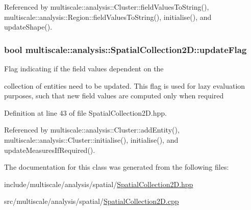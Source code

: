 Referenced by multiscale\-::analysis\-::\-Cluster\-::field\-Values\-To\-String(), multiscale\-::analysis\-::\-Region\-::field\-Values\-To\-String(), initialise(), and update\-Shape().

\hypertarget{classmultiscale_1_1analysis_1_1SpatialCollection2D_a6d942f2856adc673e9d361596744b37f}{
\subsubsection[{update\-Flag}]{\setlength{\rightskip}{0pt plus 5cm}bool multiscale\-::analysis\-::\-Spatial\-Collection2\-D\-::update\-Flag\hspace{0.3cm}{\ttfamily [protected]}}}\label{classmultiscale_1_1analysis_1_1SpatialCollection2D_a6d942f2856adc673e9d361596744b37f}
\begin{DoxyVerb}            Flag indicating if the field values dependent on the
\end{DoxyVerb}
 collection of entities need to be updated. This flag is used for lazy evaluation purposes, such that new field values are computed only when required 

Definition at line 43 of file Spatial\-Collection2\-D.\-hpp.



Referenced by multiscale\-::analysis\-::\-Cluster\-::add\-Entity(), multiscale\-::analysis\-::\-Cluster\-::initialise(), initialise(), and update\-Measures\-If\-Required().



The documentation for this class was generated from the following files\-:\begin{DoxyCompactItemize}
\item 
include/multiscale/analysis/spatial/\hyperlink{SpatialCollection2D_8hpp}{Spatial\-Collection2\-D.\-hpp}\item 
src/multiscale/analysis/spatial/\hyperlink{SpatialCollection2D_8cpp}{Spatial\-Collection2\-D.\-cpp}\end{DoxyCompactItemize}
